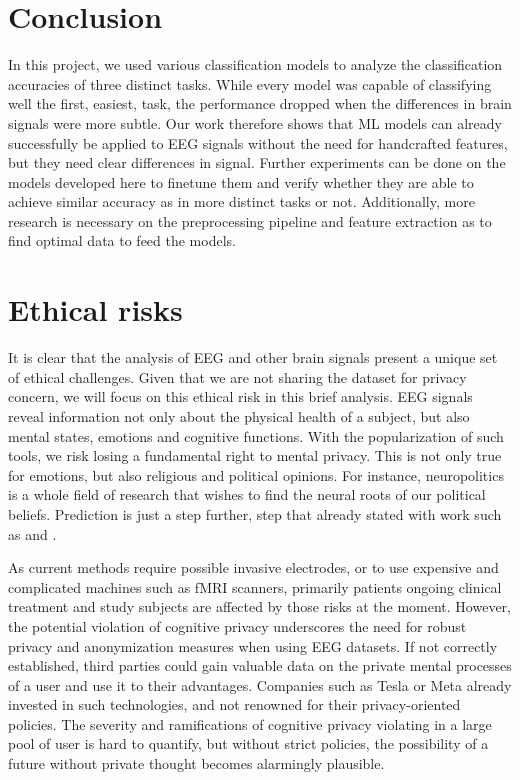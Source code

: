 \documentclass[10pt,conference,compsocconf]{IEEEtran}
\begin{document}
\section{Conclusion}
\label{sec:conclusion}
In this project, we used various classification models to analyze the classification accuracies of three distinct tasks. While every model was capable of classifying well the first, easiest, task, the performance dropped when the differences in brain signals were more subtle. Our work therefore shows that ML models can already successfully be applied to EEG signals without the need for handcrafted features, but they need clear differences in signal. Further experiments can be done on the models developed here to finetune them and verify whether they are able to achieve similar accuracy as in more distinct tasks or not. Additionally, more research is necessary on the preprocessing pipeline and feature extraction as to find optimal data to feed the models.

\newpage
\section{Ethical risks}
It is clear that the analysis of EEG and other brain signals present a unique set of ethical challenges. Given that we are not sharing the dataset for privacy concern, we will focus on this ethical risk in this brief analysis. EEG signals reveal information not only about the physical health of a subject, but also mental states, emotions and cognitive functions. With the popularization of such tools, we risk losing a fundamental right to mental privacy. This is not only true for emotions, but also religious and political opinions. For instance, neuropolitics\cite{neuropolitics} is a whole field of research that wishes to find the neural roots of our political beliefs. Prediction is just a step further, step that already stated with work such as \cite{galli_early_2021} and \cite{yun_erp_2022}.

As current methods require possible invasive electrodes, or to use expensive and complicated machines such as fMRI scanners, primarily patients ongoing clinical treatment and study subjects are affected by those risks at the moment. However, the potential violation of cognitive privacy underscores the need for robust privacy and anonymization measures when using EEG datasets. If not correctly established, third parties could gain valuable data on the private mental processes of a user and use it to their advantages. Companies such as Tesla or Meta already invested in such technologies, and not renowned for their privacy-oriented policies. The severity and ramifications of cognitive privacy violating in a large pool of user is hard to quantify, but without strict policies, the possibility of a future without private thought becomes alarmingly plausible.
\end{document}
